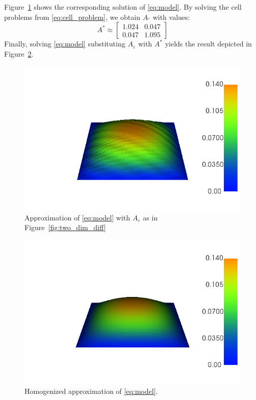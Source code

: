 \documentclass{article}
\renewcommand{\epsilon}{\varepsilon}
\begin{document}
Figure~\ref{fig:two_dim_approx} shows the corresponding solution of \eqref{eq:model}.
By solving the cell problems from \eqref{eq:cell_problem},  we obtain $A_^*$ with values:
\begin{equation}
    A^* \approx \begin{bmatrix}
        1.024 & 0.047\\
        0.047 & 1.095
    \end{bmatrix}
\end{equation}
Finally, solving \eqref{eq:model} substituting $A_\epsilon$ with $A^*$ yields the result depicted in Figure~\ref{fig:two_dim_homog_approx}.
\begin{figure}[h]
    \centering
    \includegraphics[width=0.8\linewidth]{two_dim_approx.png}
    \caption{Approximation of \eqref{eq:model} with $A_\epsilon$ as in Figure~\ref{fig:two_dim_diff}}
    \label{fig:two_dim_approx}
\end{figure}
\begin{figure}[h]
    \centering
    \includegraphics[width=0.8\linewidth]{two_dim_homog_approx.png}
    \caption{Homogenized approximation of \eqref{eq:model}.}
    \label{fig:two_dim_homog_approx}
\end{figure}
\end{document}
